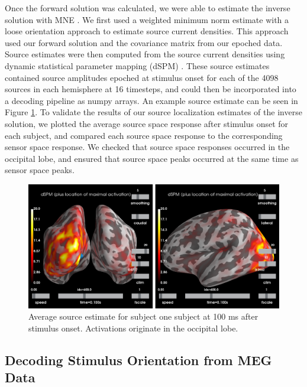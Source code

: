 \documentclass[../main.tex]{subfiles}
\begin{document}
Once the forward solution was calculated, we were able to estimate the inverse solution with MNE \citep{mne}. We first used a weighted minimum norm estimate \citep{fuchs_1999, lin_2006} with a loose orientation approach \citep{lin_2005} to estimate source current densities. This approach used our forward solution and the covariance matrix from our epoched data. Source estimates were then computed from the source current densities using dynamic statistical parameter mapping (dSPM) \citep{DALE200055}. These source estimates contained source amplitudes epoched at stimulus onset for each of the 4098 sources in each hemisphere at 16 timesteps, and could then be incorporated into a decoding pipeline as numpy arrays. An example source estimate can be seen in Figure \ref{source_ka}. To validate the results of our source localization estimates of the inverse solution, we plotted the average source space response after stimulus onset for each subject, and compared each source space response to the corresponding sensor space response. We checked that source space responses occurred in the occipital lobe, and ensured that source space peaks occurred at the same time as sensor space peaks.

\begin{figure}
    \centering
    \includegraphics[scale=0.4]{figures/methods/source_loc_KA.png}
    \caption{Average source estimate for subject one subject at 100 ms after stimulus onset. Activations originate in the occipital lobe.}
    \label{source_ka}
\end{figure}

\subsection*{Decoding Stimulus Orientation from MEG Data}
\end{document}
